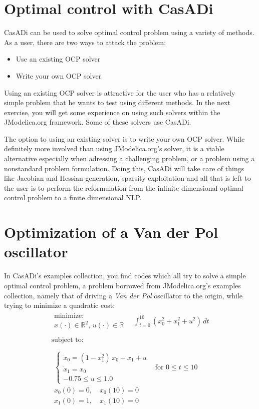 \documentclass[a4paper,12pt]{book}
\begin{document}
{\section{Optimal control with CasADi}
CasADi can be used to solve optimal control problem using a variety of methods. As a user, there are two ways to attack the problem:
\begin{itemize}
  \item Use an existing OCP solver
  \item Write your own OCP solver
\end{itemize}

Using an existing OCP solver is attractive for the user who has a relatively simple problem that he wants to test using different methods. In the next exercise, you will get some experience on using such solvers within the JModelica.org framework. Some of these solvers use CasADi.

The option to using an existing solver is to write your own OCP solver. While definitely more involved than using JModelica.org's solver, it is a viable alternative especially when adressing a challenging problem, or a problem using a nonstandard problem formulation. Doing this,   CasADi will take care of things like Jacobian and Hessian generation, sparsity exploitation and all that is left to the user is to perform the reformulation from the infinite dimensional optimal control problem to a finite dimensional NLP.

\section{Optimization of a Van der Pol oscillator}
In CasADi's examples collection, you find codes which all try to solve a simple optimal control problem, a problem borrowed from JModelica.org's examples collection, namely that of driving a \emph{Van der Pol} oscillator to the origin, while trying to minimize a quadratic cost:
\begin{equation}
\begin{array}{lc}
\begin{array}{l}
\text{minimize:} \\
x(\cdot) \in \mathbb{R}^2, \, u(\cdot) \in \mathbb{R}
\end{array}
\quad \displaystyle \int_{t=0}^{10}{(x_0^2 + x_1^2 + u^2) \, dt}
\\
\\
\text{subject to:} \\
\\
\begin{array}{ll}
\left\{
\begin{array}{l}
\dot{x}_0 = (1-x_1^2) \, x_0 - x_1 + u \\
\dot{x}_1 = x_0 \\
-0.75 \le u \le 1.0
\end{array} \right. & \text{for $0 \le t \le 10$} \\
x_0(0)=0, \quad x_0(10)=0  \\
x_1(0)=1, \quad x_1(10)=0  
\end{array}
\end{array}
\label{eq:vdp}
\end{equation}

}
\end{document}
